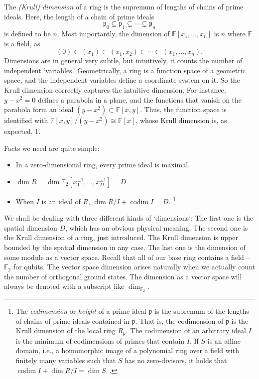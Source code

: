 \documentclass[letterpaper,12pt]{amsart}
\theoremstyle{definition} \newtheorem{defn}{Definition}
\theoremstyle{definition} \newtheorem{rem}{Remark}
\theoremstyle{definition} \newtheorem{example}{Example}
\newcommand{\codim}{\mathop{\mathrm{codim}}}
\newcommand{\FF}{\mathbb{F}}
\newcommand{\pp}{\mathfrak{p}}
\begin{document}
The {\em (Krull) dimension} of a ring is the supremum of lengths of chains of prime ideals.
Here, the length of a chain of prime ideals
\[
 \pp_0 \subsetneq \pp_1 \subsetneq \cdots \subsetneq \pp_n
\]
is defined to be $n$.
Most importantly, the dimension of $\FF[x_1,\ldots,x_n]$ is $n$ where $\FF$ is a field, as
\[
 (0) \subset (x_1) \subset (x_1,x_2) \subset \cdots \subset (x_1,\ldots,x_n) .
\]
Dimensions are in general very subtle,
but intuitively, it counts the number of independent `variables.'
Geometrically, a ring is a function space of a geometric space,
and the independent variables define a coordinate system on it.
So the Krull dimension correctly captures the intuitive dimension.
For instance, $y-x^2=0$ defines a parabola in a plane,
and the functions that vanish on the parabola form an ideal $(y-x^2) \subset \FF[x,y]$.
Thus, the function space is identified with $\FF[x,y]/(y-x^2) \cong \FF[x]$,
whose Krull dimension is, as expected, 1.

Facts we need are quite simple:
\begin{itemize}
 \item In a zero-dimensional ring, every prime ideal is maximal.
 \item $\dim R = \dim \FF_2[x_1^{\pm 1},\ldots,x_D^{\pm 1}] = D$
 \item When $I$ is an ideal of $R$, $\dim R/I + \codim I = D$.%
\footnote{
The {\em codimension} or {\em height} of a prime ideal $\pp$ is 
the supremum of the lengths of chains of prime ideals contained in $\pp$.
That is, the codimension of $\pp$ is the Krull dimension of the local ring $R_\pp$.
The codimension of an arbitrary ideal $I$ is the minimum of codimensions of primes that contain $I$.
If $S$ is an affine domain, i.e., 
a homomorphic image of a polynomial ring over a field with finitely many variables
such that $S$ has no zero-divisors,
it holds that $\codim I + \dim R/I = \dim S$~\cite[Chapter~13]{Eisenbud}.
}
\end{itemize}



We shall be dealing with three different kinds of `dimensions':
The first one is the spatial dimension $D$,
which has an obvious physical meaning.
The second one is the Krull dimension of a ring, just introduced.
The Krull dimension is upper bounded by the spatial dimension in any case.
The last one is the dimension of some module as a vector space.
Recall that all of our base ring contains a field -- $\FF_2$ for qubits.
The vector space dimension arises naturally
when we actually count the number of orthogonal ground states.
The dimension as a vector space will always be denoted with a subscript like $\dim_{\FF_2}$.
\end{document}
